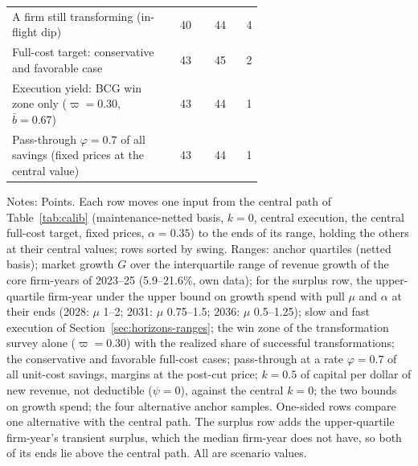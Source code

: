 \begin{table}[t]
\begin{tabular}{@{}p{0.62\linewidth}rrr@{}}
A firm still transforming (in-flight dip) & 40 & 44 & 4 \\
Full-cost target: conservative and favorable case & 43 & 45 & 2 \\
Execution yield: BCG win zone only ($\varpi=0.30$, $\bar b=0.67$) & 43 & 44 & 1 \\
Pass-through $\varphi=0.7$ of all savings (fixed prices at the central value) & 43 & 44 & 1 \\
\bottomrule\end{tabular}
\par\vspace{2pt}\footnotesize\raggedright Notes: Points. Each row moves one input from the central path of Table~\ref{tab:calib} (maintenance-netted basis, $k=0$, central execution, the central full-cost target, fixed prices, $\alpha=0.35$) to the ends of its range, holding the others at their central values; rows sorted by swing. Ranges: anchor quartiles (netted basis); market growth $G$ over the interquartile range of revenue growth of the core firm-years of 2023--25 (5.9--21.6\%, own data); for the surplus row, the upper-quartile firm-year under the upper bound on growth spend with pull $\mu$ and $\alpha$ at their ends (2028: $\mu$ 1--2; 2031: $\mu$ 0.75--1.5; 2036: $\mu$ 0.5--1.25); slow and fast execution of Section~\ref{sec:horizons-ranges}; the win zone of the transformation survey alone ($\varpi=0.30$) with the realized share of successful transformations; the conservative and favorable full-cost cases; pass-through at a rate $\varphi=0.7$ of all unit-cost savings, margins at the post-cut price; $k=0.5$ of capital per dollar of new revenue, not deductible ($\psi=0$), against the central $k=0$; the two bounds on growth spend; the four alternative anchor samples. One-sided rows compare one alternative with the central path. The surplus row adds the upper-quartile firm-year's transient surplus, which the median firm-year does not have, so both of its ends lie above the central path. All are scenario values.
\end{table}